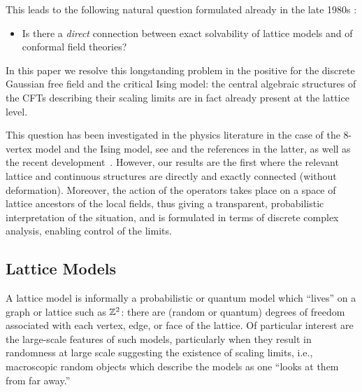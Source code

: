 \documentclass[12pt,oneside,english]{amsart}
\numberwithin{equation}{section}
\numberwithin{figure}{section}
\theoremstyle{plain}
\theoremstyle{plain}
\theoremstyle{plain}
\theoremstyle{plain}
\theoremstyle{remark}
\theoremstyle{definition}
\theoremstyle{plain}
\theoremstyle{plain}
\numberwithin{thm}{section}
\newcommand{\kallemod}[1]{{\color{kallecol} {#1}}}
\begin{document}
This leads to the following natural question formulated already in
the late 1980s \cite{itoyama-thacker}: 
\begin{itemize}
\item Is there a \emph{direct} connection between exact solvability
of lattice models and of conformal field theories?
\end{itemize}
In this paper we resolve this longstanding problem in the
positive for the discrete Gaussian free field and the critical
Ising model: the central algebraic structures of the CFTs describing
their scaling limits are in fact already present at the lattice level.

This question has been investigated in the physics literature in the
case of the 8-vertex model and the Ising model, 
see \cite{itoyama-thacker,koo-saleur}
and the references in the latter, as well as the recent 
development~\cite{gainutdinov-et-at}. However, our results are the first
where the relevant lattice and continuous structures are directly
and exactly connected (without deformation). Moreover, the action
of the operators takes place on a space of lattice ancestors of the
local fields, thus giving a transparent, probabilistic interpretation
of the situation, and is formulated in terms of discrete complex analysis,
enabling control of the limits.

\subsection{\label{subsec:lattice-models}Lattice Models}

A lattice model is informally a probabilistic or quantum model which
``lives'' on a graph or lattice such as $ \mathbb{Z}^2$: there
are (random or quantum) degrees of freedom associated with each vertex,
edge, or face of the lattice. Of particular interest are the large-scale
features of such models, particularly when they result in randomness
at large scale suggesting the existence of scaling limits, i.e., macroscopic
random objects which describe the models as one ``looks at them from
far away.''
\end{document}
